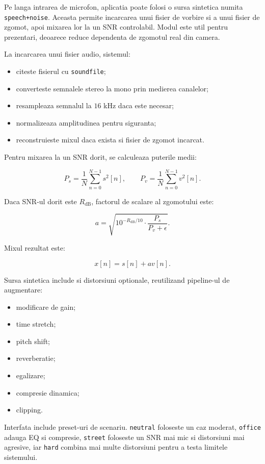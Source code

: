 Pe langa intrarea de microfon, aplicatia poate folosi o sursa sintetica numita
\texttt{speech+noise}. Aceasta permite incarcarea unui fisier de vorbire si a
unui fisier de zgomot, apoi mixarea lor la un SNR controlabil. Modul este util
pentru prezentari, deoarece reduce dependenta de zgomotul real din camera.

La incarcarea unui fisier audio, sistemul:

\begin{itemize}
    \item citeste fisierul cu \texttt{soundfile};
    \item converteste semnalele stereo la mono prin medierea canalelor;
    \item resampleaza semnalul la \(16\) kHz daca este necesar;
    \item normalizeaza amplitudinea pentru siguranta;
    \item reconstruieste mixul daca exista si fisier de zgomot incarcat.
\end{itemize}

Pentru mixarea la un SNR dorit, se calculeaza puterile medii:

\[
P_s = \frac{1}{N}\sum_{n=0}^{N-1}s^2[n],
\qquad
P_v = \frac{1}{N}\sum_{n=0}^{N-1}v^2[n].
\]

Daca SNR-ul dorit este \(R_{\text{dB}}\), factorul de scalare al zgomotului este:

\[
a =
\sqrt{
10^{-R_{\text{dB}}/10}
\cdot
\frac{P_s}{P_v + \epsilon}
}.
\]

Mixul rezultat este:

\[
x[n] = s[n] + a v[n].
\]

Sursa sintetica include si distorsiuni optionale, reutilizand pipeline-ul de
augmentare:

\begin{itemize}
    \item modificare de gain;
    \item time stretch;
    \item pitch shift;
    \item reverberatie;
    \item egalizare;
    \item compresie dinamica;
    \item clipping.
\end{itemize}

Interfata include preset-uri de scenariu. \texttt{neutral} foloseste un caz
moderat, \texttt{office} adauga EQ si compresie, \texttt{street} foloseste un
SNR mai mic si distorsiuni mai agresive, iar \texttt{hard} combina mai multe
distorsiuni pentru a testa limitele sistemului.

